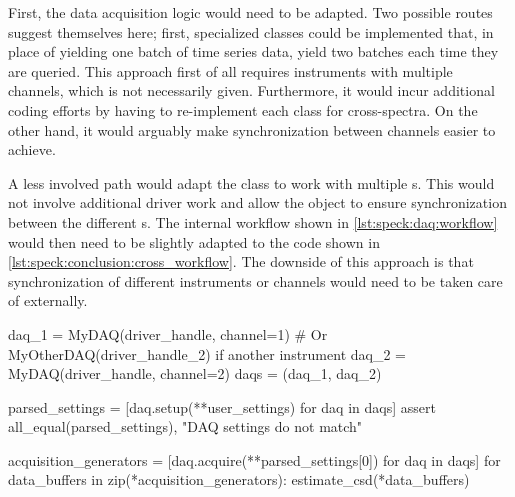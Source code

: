 First, the data acquisition logic would need to be adapted.
Two possible routes suggest themselves here; first, specialized  classes could be implemented that, in place of yielding one batch of time series data, yield two batches each time they are queried.
This approach first of all requires instruments with multiple channels,
which is not necessarily given.
Furthermore, it would incur additional coding efforts by having to re-implement each  class for cross-spectra.
On the other hand, it would arguably make synchronization between channels easier to achieve.

A less involved path would adapt the  class to work with multiple s.
This would not involve additional driver work
and allow the  object to ensure synchronization between the different s.
The internal workflow shown in \cref{lst:speck:daq:workflow} would then need to be slightly adapted to the code shown in \cref{lst:speck:conclusion:cross_workflow}.
The downside of this approach is that synchronization of different instruments or channels would need to be taken care of externally.

\begin{listing}[htpb]
    \begin{pycode}
        daq_1 = MyDAQ(driver_handle, channel=1)
        # Or MyOtherDAQ(driver_handle_2) if another instrument
        daq_2 = MyDAQ(driver_handle, channel=2)
        daqs = (daq_1, daq_2)

        parsed_settings = [daq.setup(**user_settings) for daq in daqs]
        assert all_equal(parsed_settings), "DAQ settings do not match"

        acquisition_generators = [daq.acquire(**parsed_settings[0])
                                  for daq in daqs]
        for data_buffers in zip(*acquisition_generators):
            estimate_csd(*data_buffers)
    \end{pycode}
    \caption{
        Proposed  workflow for estimating cross-spectra.
        Each hardware channel (same or different instruments) is assigned to a  object.
        After instrument configuration, it is asserted that the parameters match.
        Finally, data is fetched from both channels and fed into a \gls{csd} estimator.
        Note that triggering would need to be implemented externally.
    }
    \label{lst:speck:conclusion:cross_workflow}
\end{listing}

